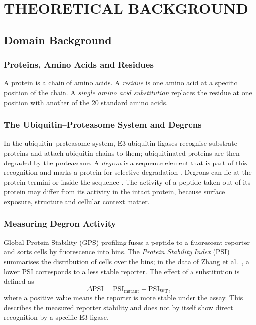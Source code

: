 \chapter{THEORETICAL BACKGROUND}\label{chap:background}

\section{Domain Background}
\subsection{Proteins, Amino Acids and Residues}
A protein is a chain of amino acids. A \emph{residue} is one amino acid at a specific position of the
chain. A \emph{single amino acid substitution} replaces the residue at one position with another of the
20 standard amino acids.

\subsection{The Ubiquitin--Proteasome System and Degrons}
In the ubiquitin--proteasome system, E3 ubiquitin ligases recognise substrate proteins and attach
ubiquitin chains to them; ubiquitinated proteins are then degraded by the proteasome. A \emph{degron} is a
sequence element that is part of this recognition and marks a protein for selective degradation
\citep{varshavsky2019,koren2018}. Degrons can lie at the protein termini or inside the sequence
\citep{zhang2023}. The activity of a peptide taken out of its protein may differ from its activity in
the intact protein, because surface exposure, structure and cellular context matter.

\subsection{Measuring Degron Activity}
Global Protein Stability (GPS) profiling \citep{yen2008} fuses a peptide to a fluorescent reporter and sorts
cells by fluorescence into bins. The \emph{Protein Stability Index} (PSI) summarises the distribution of
cells over the bins; in the data of Zhang et al.\ \citep{zhang2023}, a lower PSI corresponds to a less stable
reporter. The effect of a substitution is defined as
\begin{equation}
  \Delta\mathrm{PSI} = \mathrm{PSI}_{\mathrm{mutant}} - \mathrm{PSI}_{\mathrm{WT}},
\end{equation}
where a positive value means the reporter is more stable under the assay. This describes the measured
reporter stability and does not by itself show direct recognition by a specific E3 ligase.

